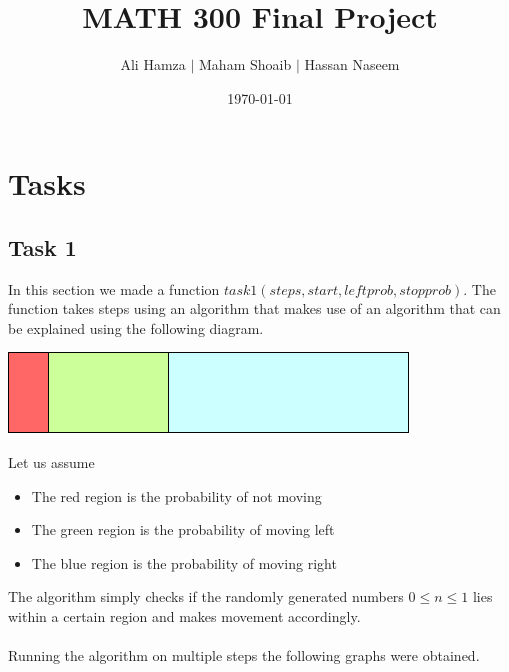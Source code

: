 \documentclass{article}
\title{\textbf{MATH 300 Final Project}}
\author{Ali Hamza $|$ Maham Shoaib $|$ Hassan Naseem}
\date{\today}
\begin{document}
\maketitle

\section{Tasks}
\subsection{Task 1}
In this section we made a function $task1(steps,start,leftprob,stopprob)$. The function takes steps using an algorithm that makes use
of an algorithm that can be explained using the following diagram.
\begin{center}
    \includegraphics*[scale = 1]{task1prob.png}
\end{center}
Let us assume
\begin{itemize}
    \item The red region is the probability of not moving
    \item The green region is the probability of moving left
    \item The blue region is the probability of moving right
\end{itemize}
The algorithm simply checks if the randomly generated numbers $0\leq n \leq 1$ lies within a certain 
region and makes movement accordingly.\\\\
Running the algorithm on multiple steps the following graphs were obtained.
\end{document}
